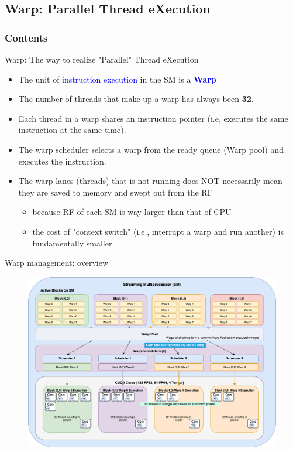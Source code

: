 \documentclass[dvipdfmx, 11pt, aspectratio=169]{beamer}   %
\begin{document}
\subsection{Warp: Parallel Thread eXecution}
\begin{frame}
    \frametitle{Contents}
    \linespread{0.6}\selectfont
\end{frame}
\begin{frame}{Warp: The way to realize "Parallel" Thread eXecution}
  \begin{itemize}
    \item The unit of \textcolor{blue}{instruction execution} in the SM is a \textcolor{blue}{\textbf{Warp}}
    \item The number of threads that make up a warp has always been \textbf{32}.
    \item Each thread in a warp shares an instruction pointer (i.e, executes the same instruction at the same time).
    \item The warp scheduler selects a warp from the ready queue (Warp pool) and executes the instruction.
    \item The warp lanes (threads) that is not running does NOT necessarily mean they are saved to memory and swept out from the RF
    \begin{itemize}
      \item because RF of each SM is way larger than that of CPU
      \item the cost of "context switch" (i.e., interrupt a warp and run another) is fundamentally smaller
    \end{itemize}
  \end{itemize}
\end{frame}
\begin{frame}{Warp management: overview}
  \begin{figure}
    \includegraphics[scale=0.075]{img/warpScheduling.png}
  \end{figure}
\end{frame}
\end{document}
